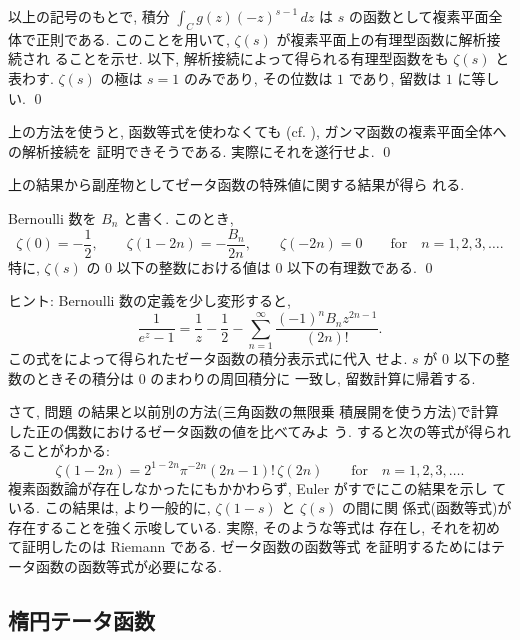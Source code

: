\documentclass[12pt,twoside]{jarticle}
\begin{document}
\begin{question}
  以上の記号のもとで, 積分 $\displaystyle \int_C g(z) (-z)^{s-1}\,dz$ 
  は $s$ の函数として複素平面全体で正則である. %
  このことを用いて, $\zeta(s)$ が複素平面上の有理型函数に解析接続され
  ることを示せ. 以下, 解析接続によって得られる有理型函数をも 
  $\zeta(s)$ と表わす. $\zeta(s)$ の極は $s=1$ のみであり, その位数は 
  $1$ であり, 留数は $1$ に等しい.
  \qed
\end{question}

\begin{question}
  上の方法を使うと, 函数等式を使わなくても %
  (cf. ), ガンマ函数の複素平面全体への解析接続を
  証明できそうである. 実際にそれを遂行せよ.
  \qed
\end{question}

\noindent 上の結果から副産物としてゼータ函数の特殊値に関する結果が得ら
れる.

\begin{question}\label{q:Zeta-spval1}
  Bernoulli 数を $B_n$ と書く. このとき,  
  \[
    \zeta(0) = - \frac{1}{2},
    \qquad
    \zeta(1-2n) = - \frac{B_n}{2n},
    \qquad
    \zeta(-2n) = 0
    \qquad\mbox{for}\quad  n = 1,2,3,\dots.
  \]%
  特に, $\zeta(s)$ の $0$ 以下の整数における値は $0$ 以下の有理数である.
  \qed
\end{question}

\noindent ヒント: Bernoulli 数の定義を少し変形すると,
\[
  \frac{1}{e^z - 1}
  = \frac{1}{z} - \frac{1}{2}
    - \sum_{n=1}^\infty \frac{(-1)^n B_n z^{2n-1}}{(2n)!}.
\]%
この式をによって得られたゼータ函数の積分表示式に代入
せよ.  $s$ が $0$ 以下の整数のときその積分は $0$ のまわりの周回積分に
一致し, 留数計算に帰着する.

さて, 問題  の結果と以前別の方法(三角函数の無限乗
積展開を使う方法)で計算した正の偶数におけるゼータ函数の値を比べてみよ
う. すると次の等式が得られることがわかる:
\[
  \zeta(1 - 2n) = 2^{1 - 2n} \pi^{-2n} (2n-1)!\, \zeta(2n)
  \qquad\mbox{for}\quad
  n = 1,2,3,\dots.
\]%
複素函数論が存在しなかったにもかかわらず, Euler がすでにこの結果を示し
ている. この結果は, より一般的に, $\zeta(1-s)$ と $\zeta(s)$ の間に関
係式(函数等式)が存在することを強く示唆している. 実際, そのような等式は
存在し, それを初めて証明したのは Riemann である. ゼータ函数の函数等式
を証明するためにはテータ函数の函数等式が必要になる.



\subsection{楕円テータ函数}
\end{document}
